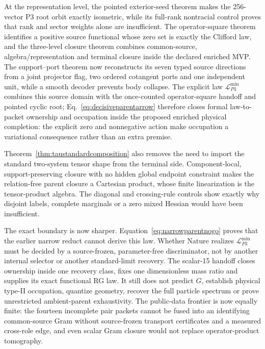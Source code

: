 \documentclass[11pt]{article}
\begin{document}
At the representation level, the pointed exterior-seed theorem makes the
256-vector P3 root orbit exactly isometric, while its full-rank nontracial
control proves that rank and sector weights alone are insufficient.  The
operator-square theorem identifies a positive source functional whose zero
set is exactly the Clifford law, and the three-level closure theorem combines
common-source, algebra/representation and terminal closure inside the
declared enriched MVP.  The support--port theorem now reconstructs its seven
typed source directions from a joint projector flag, two ordered cotangent
ports and one independent unit, while a smooth decoder prevents body
collapse.  The explicit law $\mathcal L_{P3}^{\min}$ combines this source
domain with the once-counted operator-square handoff and pointed cyclic root;
Eq.~\eqref{eq:decisiveparentarrow} therefore closes formal law-to-packet
ownership and occupation inside the proposed enriched physical completion:
the explicit zero and nonnegative action make occupation a variational
consequence rather than an extra premise.

Theorem~\ref{thm:taustandardcomposition} also removes the need to import the
standard two-system tensor shape from the terminal side.  Component-local,
support-preserving closure with no hidden global endpoint constraint makes
the relation-free parent closure a Cartesian product, whose finite
linearization is the tensor-product algebra.  The diagonal and crossing-rule
controls show exactly why disjoint labels, complete marginals or a zero mixed
Hessian would have been insufficient.

The exact boundary is now sharper.  Equation~\eqref{eq:narrowparentnogo}
proves that the earlier narrow reduct cannot derive this law.  Whether Nature
realizes $\mathcal L_{P3}^{\min}$ must be decided by a source-frozen,
parameter-free discriminator, not by another internal selector or another
standard-limit recovery.  The scalar-15 handoff closes ownership inside one
recovery class, fixes one dimensionless mass ratio and supplies its exact
functional RG law.  It still does not predict \(G\), establish physical
type-II occupation, quantize geometry, recover the full particle spectrum or
prove unrestricted ambient-parent exhaustivity.
The public-data frontier is now equally finite: the fourteen incomplete pair
packets cannot be fused into an identifying common-source Gram without
source-frozen transport certificates and a measured cross-role edge, and
even scalar Gram closure would not replace operator-product tomography.
\end{document}

